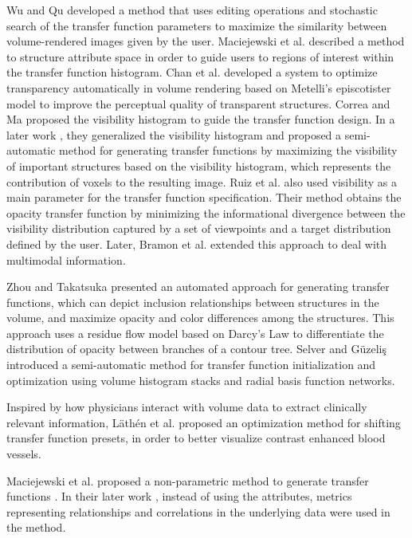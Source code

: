 \documentclass{egpubl}
\begin{document}
Wu and Qu \cite{wu_interactive_2007} developed a method that uses editing operations and stochastic search of the transfer function parameters to maximize the similarity between volume-rendered images given by the user.
Maciejewski et al. \cite{maciejewski_structuring_2009} described a method to structure attribute space in order to guide users to regions of interest within the transfer function histogram.
Chan et al. \cite{chan_perception-based_2009} developed a system to optimize transparency automatically in volume rendering based on Metelli's episcotister model to improve the perceptual quality of transparent structures.
Correa and Ma \cite{correa_visibility-driven_2009} proposed the visibility histogram to guide the transfer function design. In a later work \cite{correa_visibility_2011}, they generalized the visibility histogram and proposed a semi-automatic method for generating transfer functions by maximizing the visibility of important structures based on the visibility histogram, which represents the contribution of voxels to the resulting image.
Ruiz et al. \cite{ruiz_automatic_2011} also used visibility as a main parameter for the transfer function specification. Their method obtains the opacity transfer function by minimizing the informational divergence between the visibility distribution captured by a set of viewpoints and a target distribution defined by the user. Later, Bramon et al. \cite{bramon_information_2013} extended this approach to deal with multimodal information.

Zhou and Takatsuka \cite{zhou_automatic_2009} presented an automated approach for generating transfer functions, which can depict inclusion relationships between structures in the volume, and maximize opacity and color differences among the structures. This approach uses a residue flow model based on Darcy's Law to differentiate the distribution of opacity between branches of a contour tree.
Selver and G{\"u}zeli{\c s} \cite{alper_selver_semiautomatic_2009} introduced a semi-automatic method for transfer function initialization and optimization using volume histogram stacks and radial basis function networks.

Inspired by how physicians interact with volume data to extract clinically relevant information, L{\"a}th{\'e}n et al. \cite{lathen_automatic_2012} proposed an optimization method for shifting transfer function presets, in order to better visualize contrast enhanced blood vessels.

Maciejewski et al. proposed a non-parametric method to generate transfer functions \cite{maciejewski_structuring_2009}.
In their later work \cite{maciejewski_abstracting_2013}, instead of using the attributes, metrics representing relationships and correlations in the underlying data were used in the method.
\end{document}
